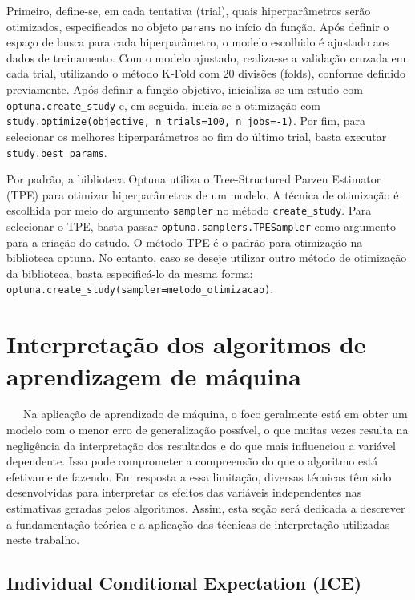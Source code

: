 \documentclass[
  12pt,
  a4paper,
]{scrreprt}
\begin{document}
Primeiro, define-se, em cada tentativa (trial), quais hiperparâmetros
serão otimizados, especificados no objeto \texttt{params} no início da
função. Após definir o espaço de busca para cada hiperparâmetro, o
modelo escolhido é ajustado aos dados de treinamento. Com o modelo
ajustado, realiza-se a validação cruzada em cada trial, utilizando o
método K-Fold com 20 divisões (folds), conforme definido previamente.
Após definir a função objetivo, inicializa-se um estudo com
\texttt{optuna.create\_study} e, em seguida, inicia-se a otimização com
\texttt{study.optimize(objective,\ n\_trials=100,\ n\_jobs=-1)}. Por
fim, para selecionar os melhores hiperparâmetros ao fim do último trial,
basta executar \texttt{study.best\_params}.

\vspace{12pt}

Por padrão, a biblioteca Optuna utiliza o Tree-Structured Parzen
Estimator (TPE) para otimizar hiperparâmetros de um modelo. A técnica de
otimização é escolhida por meio do argumento \texttt{sampler} no método
\texttt{create\_study}. Para selecionar o TPE, basta passar
\texttt{optuna.samplers.TPESampler} como argumento para a criação do
estudo. O método TPE é o padrão para otimização na biblioteca optuna. No
entanto, caso se deseje utilizar outro método de otimização da
biblioteca, basta especificá-lo da mesma forma:
\texttt{optuna.create\_study(sampler=metodo\_otimizacao)}.

\section{Interpretação dos algoritmos de aprendizagem de
máquina}\label{interpretauxe7uxe3o-dos-algoritmos-de-aprendizagem-de-muxe1quina}

~~~Na aplicação de aprendizado de máquina, o foco geralmente está em
obter um modelo com o menor erro de generalização possível, o que muitas
vezes resulta na negligência da interpretação dos resultados e do que
mais influenciou a variável dependente. Isso pode comprometer a
compreensão do que o algoritmo está efetivamente fazendo. Em resposta a
essa limitação, diversas técnicas têm sido desenvolvidas para
interpretar os efeitos das variáveis independentes nas estimativas
geradas pelos algoritmos. Assim, esta seção será dedicada a descrever a
fundamentação teórica e a aplicação das técnicas de interpretação
utilizadas neste trabalho.

\subsection{Individual Conditional Expectation
(ICE)}\label{individual-conditional-expectation-ice}
\end{document}
